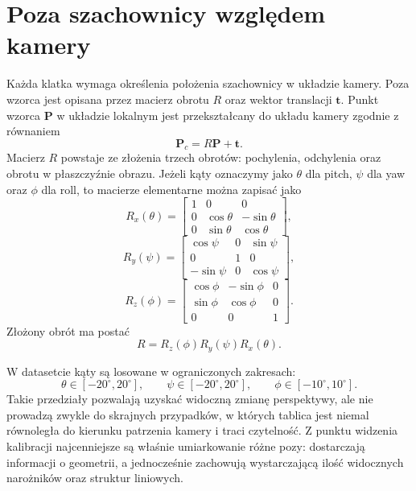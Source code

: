 \documentclass[12pt,a4paper]{report}
\begin{document}
\section{Poza szachownicy względem kamery}
Każda klatka wymaga określenia położenia szachownicy w układzie kamery. Poza wzorca jest
opisana przez macierz obrotu $R$ oraz wektor translacji $\mathbf{t}$. Punkt wzorca
$\mathbf{P}$ w układzie lokalnym jest przekształcany do układu kamery zgodnie z równaniem
\begin{equation}
    \mathbf{P}_c = R\mathbf{P} + \mathbf{t}.
\end{equation}
Macierz $R$ powstaje ze złożenia trzech obrotów: pochylenia, odchylenia oraz obrotu w płaszczyźnie
obrazu. Jeżeli kąty oznaczymy jako $\theta$ dla pitch, $\psi$ dla yaw oraz $\phi$ dla roll,
to macierze elementarne można zapisać jako
\begin{equation}
    R_x(\theta) =
    \begin{bmatrix}
        1 & 0 & 0 \\
        0 & \cos\theta & -\sin\theta \\
        0 & \sin\theta & \cos\theta
    \end{bmatrix},
\end{equation}
\begin{equation}
    R_y(\psi) =
    \begin{bmatrix}
        \cos\psi & 0 & \sin\psi \\
        0 & 1 & 0 \\
        -\sin\psi & 0 & \cos\psi
    \end{bmatrix},
\end{equation}
\begin{equation}
    R_z(\phi) =
    \begin{bmatrix}
        \cos\phi & -\sin\phi & 0 \\
        \sin\phi & \cos\phi & 0 \\
        0 & 0 & 1
    \end{bmatrix}.
\end{equation}
Złożony obrót ma postać
\begin{equation}
    R = R_z(\phi)R_y(\psi)R_x(\theta).
\end{equation}

W datasetcie kąty są losowane w ograniczonych zakresach:
\begin{equation}
    \theta \in [-20^\circ,20^\circ],
    \qquad
    \psi \in [-20^\circ,20^\circ],
    \qquad
    \phi \in [-10^\circ,10^\circ].
\end{equation}
Takie przedziały pozwalają uzyskać widoczną zmianę perspektywy, ale nie prowadzą zwykle
do skrajnych przypadków, w których tablica jest niemal równoległa do kierunku patrzenia kamery
i traci czytelność. Z punktu widzenia kalibracji najcenniejsze są właśnie umiarkowanie różne
pozy: dostarczają informacji o geometrii, a jednocześnie zachowują wystarczającą ilość
widocznych narożników oraz struktur liniowych.
\end{document}
